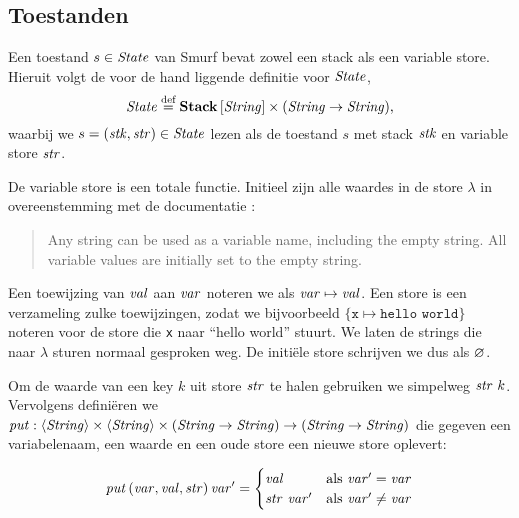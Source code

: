\subsection{Toestanden}
\label{sec:def:state}

Een toestand $s\in\mathit{State}$ van Smurf bevat zowel een stack als een variable
store. Hieruit volgt de voor de hand liggende definitie voor $\mathit{State}$,
$$\mathit{State} \stackrel{\text{def}}{=} \mathbf{Stack}\left[\mathit{\mathit{String}}\right] \times (\mathit{String} \to \mathit{String}),$$
waarbij we $s=(\mathit{stk},\mathit{str})\in\mathit{State}$ lezen als de toestand $s$ met stack $\mathit{stk}$
en variable store $\mathit{str}$.

De variable store is een totale functie. Initieel zijn alle waardes in de store
$\lambda$ in overeenstemming met de documentatie \cite{safalra}:

\begin{quote}
	Any string can be used as a variable name, including the empty string. All
	variable values are initially set to the empty string.
\end{quote}

Een toewijzing van $\mathit{val}$ aan $\mathit{var}$ noteren we als $\mathit{var}\mapsto\mathit{val}$. Een
store is een verzameling zulke toewijzingen, zodat we bijvoorbeeld
$\{\texttt{x}\mapsto\texttt{hello world}\}$ noteren voor de store die
\texttt{x} naar ``hello world'' stuurt. We laten de strings die naar $\lambda$
sturen normaal gesproken weg. De initiële store schrijven we dus als
$\varnothing$.

Om de waarde van een key $k$ uit store $\mathit{str}$ te halen gebruiken we simpelweg
$\mathit{str}~k$. Vervolgens definiëren we $\mathit{put}:\langle\mathit{String}\rangle \times \langle\mathit{String}\rangle \times
(\mathit{String}\to\mathit{String}) \to (\mathit{String}\to\mathit{String})$ die gegeven een variabelenaam, een
waarde en een oude store een nieuwe store oplevert:

$$
	\mathit{put}\left(\mathit{var}, \mathit{val}, \mathit{str}\right) \mathit{var}' =
		\begin{cases}
			\mathit{val}       & \text{als $\mathit{var}'=\mathit{var}$} \\
			\mathit{str}~\mathit{var}' & \text{als $\mathit{var}'\ne\mathit{var}$}
		\end{cases}
$$

